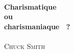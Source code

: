 
\pagestyle{empty}

\begin{titlepage}
\begin{center}
\mbox{}
\vfill
\HRule \\[0.4cm]
{ \LARGE \bfseries Charismatique\\ ou\\ \og charismaniaque \fg{}~?}\\[0.4cm]

\HRule \\[1.5cm]
\textsc{\Large Chuck Smith}\\[1.5cm]
\vfill
\mbox{}
\end{center}
\end{titlepage}

